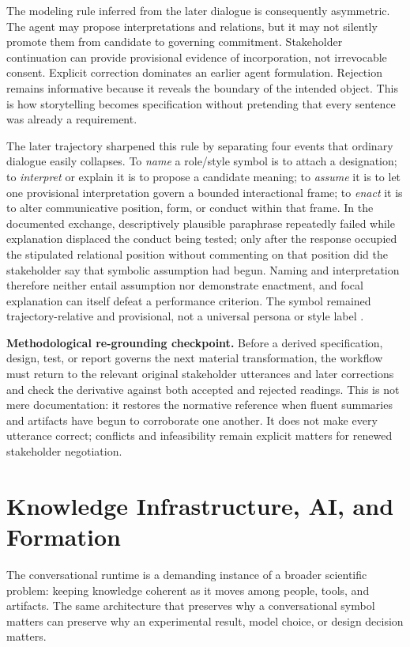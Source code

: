 \documentclass[10pt,a4paper]{article}
\begin{document}
The modeling rule inferred from the later dialogue is consequently asymmetric. The agent may propose interpretations and relations, but it may not silently promote them from candidate to governing commitment. Stakeholder continuation can provide provisional evidence of incorporation, not irrevocable consent. Explicit correction dominates an earlier agent formulation. Rejection remains informative because it reveals the boundary of the intended object. This is how storytelling becomes specification without pretending that every sentence was already a requirement.

The later trajectory sharpened this rule by separating four events that ordinary dialogue easily collapses. To \emph{name} a role/style symbol is to attach a designation; to \emph{interpret} or explain it is to propose a candidate meaning; to \emph{assume} it is to let one provisional interpretation govern a bounded interactional frame; to \emph{enact} it is to alter communicative position, form, or conduct within that frame. In the documented exchange, descriptively plausible paraphrase repeatedly failed while explanation displaced the conduct being tested; only after the response occupied the stipulated relational position without commenting on that position did the stakeholder say that symbolic assumption had begun. Naming and interpretation therefore neither entail assumption nor demonstrate enactment, and focal explanation can itself defeat a performance criterion. The symbol remained trajectory-relative and provisional, not a universal persona or style label \cite{sessionrecord}.

\noindent\textbf{Methodological re-grounding checkpoint.} Before a derived specification, design, test, or report governs the next material transformation, the workflow must return to the relevant original stakeholder utterances and later corrections and check the derivative against both accepted and rejected readings. This is not mere documentation: it restores the normative reference when fluent summaries and artifacts have begun to corroborate one another. It does not make every utterance correct; conflicts and infeasibility remain explicit matters for renewed stakeholder negotiation.

\section{Knowledge Infrastructure, AI, and Formation}

The conversational runtime is a demanding instance of a broader scientific problem: keeping knowledge coherent as it moves among people, tools, and artifacts. The same architecture that preserves why a conversational symbol matters can preserve why an experimental result, model choice, or design decision matters.
\end{document}

